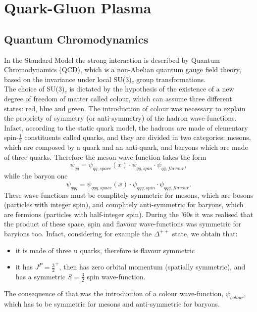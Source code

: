 \documentclass[b5paper,10pt,twoside,oldstyle,classica]{toptesi}
\begin{document}
\tableofcontents

\listoffigures

\listoftables
\newpage
\thispagestyle{empty}
\cleardoublepage

\mainmatter
\chapter{Quark-Gluon Plasma}
\label{QGP-section}
\section{Quantum Chromodynamics}
In the Standard Model the strong interaction is described by Quantum Chromodynamics (QCD), which is a non-Abelian quantum gauge field theory, based on the invariance under local SU(3)$_{c}$ group transformations.\\
The choice of SU(3)$_c$ is dictated by the hypothesis of the existence of a new degree of freedom of matter called colour, which can assume three different states: red, blue and green. The introduction of colour was necessary to explain the propriety of symmetry (or anti-symmetry) of the hadron wave-functions. Infact, according to the static quark model, the hadrons are made of elementary spin-$\frac{1}{2}$ constituents called quarks, and they are divided in two categories: mesons, which are composed by a quark and an anti-quark, and baryons which are made of three quarks. Therefore the meson wave-function takes the form
\begin{equation}
\psi_{q\bar{q}} = \psi_{q\bar{q},space}(x)\cdot\psi_{q\bar{q},spin}\cdot\psi_{q\bar{q},flavour},
\end{equation}
while the baryon one
\begin{equation}
\psi_{qqq} = \psi_{qqq,space}(x)\cdot\psi_{qqq,spin}\cdot\psi_{qqq,flavour}.
\end{equation}
These wave-functions must be complitely symmetric for mesons, which are bosons (particles with integer spin), and complitely anti-symmetric for baryons, which are fermions (particles with half-integer spin).
During the '60s it was realised that the product of these space, spin and flavour wave-functions was symmetric for baryions too. Infact, considering for example the $\Delta^{++}$ state, we obtain that:
\begin{itemize}
 \item it is made of three u quarks, therefore is flavour symmetric
 \item it has $J^P = \frac{3}{2}^{+}$, then has zero orbital momentum (spatially symmetric), and has a symmetric $S = \frac{3}{2}$ spin wave-function. 
\end{itemize}
 The consequence of that was the introduction of a colour wave-function, $\psi_{colour}$, which has to be symmetric for mesons and anti-symmetric for baryons. 
\end{document}
